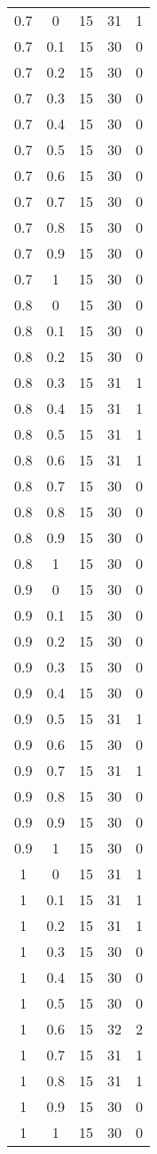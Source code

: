 \begin{longtable}{|c|c|c|c|c|}
	0.7& 0& 15& 31& 1 \\
	0.7& 0.1& 15& 30& 0 \\
	0.7& 0.2& 15& 30& 0 \\
	0.7& 0.3& 15& 30& 0 \\
	0.7& 0.4& 15& 30& 0 \\
	0.7& 0.5& 15& 30& 0 \\
	0.7& 0.6& 15& 30& 0 \\
	0.7& 0.7& 15& 30& 0 \\
	0.7& 0.8& 15& 30& 0 \\
	0.7& 0.9& 15& 30& 0 \\
	0.7& 1& 15& 30& 0 \\
	\hline
	
	0.8& 0& 15& 30& 0 \\
	0.8& 0.1& 15& 30& 0 \\
	0.8& 0.2& 15& 30& 0 \\
	0.8& 0.3& 15& 31& 1 \\
	0.8& 0.4& 15& 31& 1 \\
	0.8& 0.5& 15& 31& 1 \\
	0.8& 0.6& 15& 31& 1 \\
	0.8& 0.7& 15& 30& 0 \\
	0.8& 0.8& 15& 30& 0 \\
	0.8& 0.9& 15& 30& 0 \\
	0.8& 1& 15& 30& 0 \\
	\hline
	
	0.9& 0& 15& 30& 0 \\
	0.9& 0.1& 15& 30& 0 \\
	0.9& 0.2& 15& 30& 0 \\
	0.9& 0.3& 15& 30& 0 \\
	0.9& 0.4& 15& 30& 0 \\
	0.9& 0.5& 15& 31& 1 \\
	0.9& 0.6& 15& 30& 0 \\
	0.9& 0.7& 15& 31& 1 \\
	0.9& 0.8& 15& 30& 0 \\
	0.9& 0.9& 15& 30& 0 \\
	0.9& 1& 15& 30& 0 \\
	\hline
	
	1& 0& 15& 31& 1 \\
	1& 0.1& 15& 31& 1 \\
	1& 0.2& 15& 31& 1 \\
	1& 0.3& 15& 30& 0 \\
	1& 0.4& 15& 30& 0 \\
	1& 0.5& 15& 30& 0 \\
	1& 0.6& 15& 32& 2 \\
	1& 0.7& 15& 31& 1 \\
	1& 0.8& 15& 31& 1 \\
	1& 0.9& 15& 30& 0 \\
	1& 1& 15& 30& 0 \\
	
\end{longtable}


